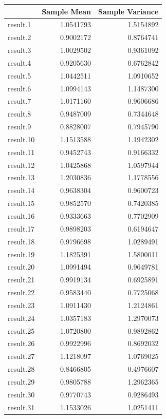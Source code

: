 \documentclass[
  letterpaper,
  DIV=11,
  numbers=noendperiod]{scrreprt}
\begin{document}
\begin{longtable}[]{@{}lrr@{}}
\toprule\noalign{}
& Sample Mean & Sample Variance \\
\midrule\noalign{}
\endhead
\bottomrule\noalign{}
\endlastfoot
result.1 & 1.0541793 & 1.5154892 \\
result.2 & 0.9002172 & 0.8764741 \\
result.3 & 1.0029502 & 0.9361092 \\
result.4 & 0.9205630 & 0.6762842 \\
result.5 & 1.0442511 & 1.0910652 \\
result.6 & 1.0994143 & 1.1487300 \\
result.7 & 1.0171160 & 0.9606686 \\
result.8 & 0.9487009 & 0.7344648 \\
result.9 & 0.8828007 & 0.7945790 \\
result.10 & 1.1513588 & 1.1942302 \\
result.11 & 0.9452743 & 0.9166332 \\
result.12 & 1.0425868 & 1.0597944 \\
result.13 & 1.2030836 & 1.1778556 \\
result.14 & 0.9638304 & 0.9600723 \\
result.15 & 0.9852570 & 0.7420385 \\
result.16 & 0.9333663 & 0.7702909 \\
result.17 & 0.9898203 & 0.6194647 \\
result.18 & 0.9796698 & 1.0289491 \\
result.19 & 1.1825391 & 1.5800011 \\
result.20 & 1.0991494 & 0.9649781 \\
result.21 & 0.9919134 & 0.6925891 \\
result.22 & 0.9583440 & 0.7725068 \\
result.23 & 1.0911430 & 1.2124861 \\
result.24 & 1.0357183 & 1.2970073 \\
result.25 & 1.0720800 & 0.9892862 \\
result.26 & 0.9922996 & 0.8692032 \\
result.27 & 1.1218097 & 1.0769025 \\
result.28 & 0.8466805 & 0.4976607 \\
result.29 & 0.9805788 & 1.2962365 \\
result.30 & 0.9770743 & 0.9286493 \\
result.31 & 1.1533026 & 1.0251411 \\

\end{longtable}
\end{document}
